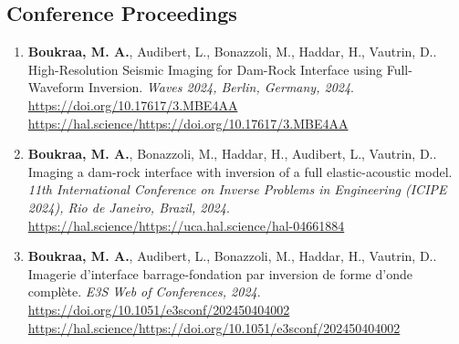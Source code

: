 \documentclass[10pt]{article}
\begin{document}
\subsection{Conference Proceedings}
\begin{enumerate}
\item \textbf{Boukraa, M. A.}, Audibert, L., Bonazzoli, M., Haddar, H., Vautrin, D.. High-Resolution Seismic Imaging for Dam-Rock Interface using Full-Waveform Inversion. \textit{Waves 2024, Berlin, Germany, 2024}. \url{https://doi.org/10.17617/3.MBE4AA} \url{https://hal.science/https://doi.org/10.17617/3.MBE4AA}
\item \textbf{Boukraa, M. A.}, Bonazzoli, M., Haddar, H., Audibert, L., Vautrin, D.. Imaging a dam-rock interface with inversion of a full elastic-acoustic model. \textit{11th International Conference on Inverse Problems in Engineering (ICIPE 2024), Rio de Janeiro, Brazil, 2024}. \url{https://hal.science/https://uca.hal.science/hal-04661884}
\item \textbf{Boukraa, M. A.}, Audibert, L., Bonazzoli, M., Haddar, H., Vautrin, D.. Imagerie d’interface barrage-fondation par inversion de forme d’onde complète. \textit{E3S Web of Conferences, 2024}. \url{https://doi.org/10.1051/e3sconf/202450404002} \url{https://hal.science/https://doi.org/10.1051/e3sconf/202450404002}
\end{enumerate}
\end{document}
